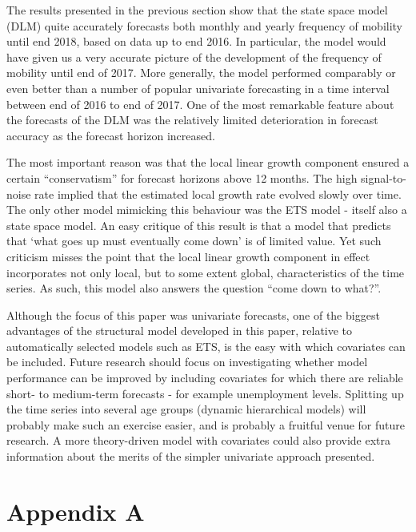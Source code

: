 \documentclass[]{article}
\begin{document}
The results presented in the previous section show that the state space
model (DLM) quite accurately forecasts both monthly and yearly frequency
of mobility until end 2018, based on data up to end 2016. In particular,
the model would have given us a very accurate picture of the development
of the frequency of mobility until end of 2017. More generally, the
model performed comparably or even better than a number of popular
univariate forecasting in a time interval between end of 2016 to end of
2017. One of the most remarkable feature about the forecasts of the DLM
was the relatively limited deterioration in forecast accuracy as the
forecast horizon increased.

The most important reason was that the local linear growth component
ensured a certain ``conservatism'' for forecast horizons above 12
months. The high signal-to-noise rate implied that the estimated local
growth rate evolved slowly over time. The only other model mimicking
this behaviour was the ETS model - itself also a state space model. An
easy critique of this result is that a model that predicts that `what
goes up must eventually come down' is of limited value. Yet such
criticism misses the point that the local linear growth component in
effect incorporates not only local, but to some extent global,
characteristics of the time series. As such, this model also answers the
question ``come down to what?''.

Although the focus of this paper was univariate forecasts, one of the
biggest advantages of the structural model developed in this paper,
relative to automatically selected models such as ETS, is the easy with
which covariates can be included. Future research should focus on
investigating whether model performance can be improved by including
covariates for which there are reliable short- to medium-term forecasts
- for example unemployment levels. Splitting up the time series into
several age groups (dynamic hierarchical models) will probably make such
an exercise easier, and is probably a fruitful venue for future
research. A more theory-driven model with covariates could also provide
extra information about the merits of the simpler univariate approach
presented.

\section{Appendix A}\label{appendix-a}
\end{document}
